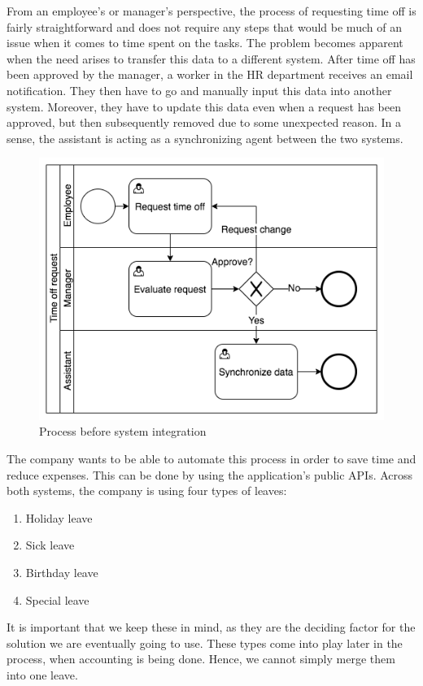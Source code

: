 \documentclass[12pt,oneside]{fithesis2}
\begin{document}
    From an employee's or manager's perspective, the process of requesting time off is fairly straightforward and does not require any steps that would be much of an issue when it comes to time spent on the tasks. The problem becomes apparent when the need arises to transfer this data to a different system. After time off has been approved by the manager, a worker in the HR department receives an email notification. They then have to go and manually input this data into another system. Moreover, they have to update this data even when a request has been approved, but then subsequently removed due to some unexpected reason. In a sense, the assistant is acting as a synchronizing agent between the two systems.
    
    \begin{figure}[H]
        \centering
        \includegraphics[width=\textwidth]{before_sys_integration.png}
        \caption{Process before system integration}
        \label{fig:before_sys_integration}
    \end{figure}
    The company wants to be able to automate this process in order to save time and reduce expenses. This can be done by using the application's public APIs.
    \newline\newline
    Across both systems, the company is using four types of leaves:
    \begin{enumerate}
        \setlength\itemsep{0em}
        \item Holiday leave
        \item Sick leave
        \item Birthday leave
        \item Special leave
    \end{enumerate}
    It is important that we keep these in mind, as they are the deciding factor for the solution we are eventually going to use. These types come into play later in the process, when accounting is being done. Hence, we cannot simply merge them into one leave.
    
\end{document}
